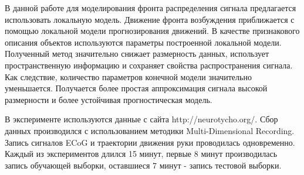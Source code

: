 \documentclass[12pt,twoside]{article}
\begin{document}
В данной работе для моделирования фронта распределения сигнала предлагается использовать локальную модель. Движение фронта возбуждения приближается с помощью локальной модели прогнозирования движений. В качестве признакового описания объектов используются параметры построенной локальной модели. Полученный  метод значительно снижает размерность данных, использует пространственную информацию и сохраняет свойства распространения сигнала.
Как следствие, количество параметров конечной модели значительно уменьшается. Получается более простая аппроксимация сигнала высокой размерности и более устойчивая прогностическая модель.


В эксперименте используются данные с сайта http://neurotycho.org/. Сбор данных производился с использованием методики Multi-Dimensional Recording. Запись сигналов ECoG и траектории движения руки проводилась одновременно. Каждый из экспериментов длился 15 минут, первые 8 минут производилась запись обучающей выборки, оставшиеся 7 минут - запись тестовой выборки. \\\\
\end{document}
